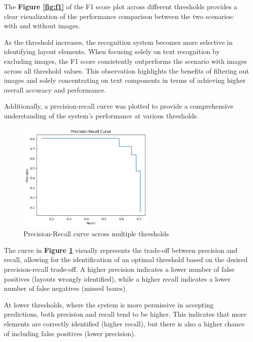 The \textbf{Figure \ref{fig:f1}} of the F1 score plot across different thresholds provides a clear visualization of the performance comparison between the two scenarios: with and without images. 

As the threshold increases, the recognition system becomes more selective in identifying layout elements. 
When focusing solely on text recognition by excluding images, the F1 score consistently outperforms the scenario with images across all threshold values. This observation highlights the benefits of filtering out images and solely concentrating on text components in terms of achieving higher overall accuracy and performance.

Additionally, a precision-recall curve was plotted to provide a comprehensive understanding of the system's performance at various thresholds. 

\begin{figure}[H]
    \centering
    \includegraphics[width=0.6\textwidth]{Images/precision_recall.png}
    \caption{Precision-Recall curve across multiple thresholds}
    \label{fig:prec_rec}
\end{figure}

The curve in \textbf{Figure \ref{fig:prec_rec}} visually represents the trade-off between precision and recall, allowing for the identification of an optimal threshold based on the desired precision-recall trade-off. 
A higher precision indicates a lower number of false positives (layouts wrongly identified), while a higher recall indicates a lower number of false negatives (missed boxes).

At lower thresholds, where the system is more permissive in accepting predictions, both precision and recall tend to be higher. This indicates that more elements are correctly identified (higher recall), but there is also a higher chance of including false positives (lower precision).

